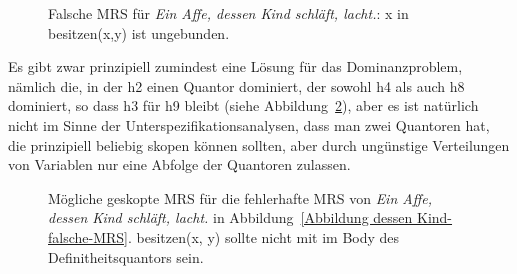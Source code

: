 \begin{figure}

\caption{Falsche MRS für \emph{Ein Affe, dessen Kind schläft, lacht.}: x in besitzen(x,y) ist ungebunden.}\label{Abbildung dessen Kind-falsch-x-ungebunden}
\end{figure}

Es gibt zwar prinzipiell zumindest eine Lösung für das Dominanzproblem, nämlich die, in der h2 einen
Quantor dominiert, der sowohl h4 als auch h8 dominiert, so dass h3 für h9 bleibt (siehe
Abbildung~\ref{Abbildung dessen Kind-falsch-geskopt}), aber es ist natürlich nicht im Sinne der
Unterspezifikationsanalysen, dass man zwei Quantoren hat, die prinzipiell beliebig skopen können
sollten, aber durch ungünstige Verteilungen von Variablen nur eine Abfolge der Quantoren zulassen.

\begin{figure}

\caption{Mögliche geskopte MRS für die fehlerhafte MRS von \emph{Ein Affe, dessen Kind schläft,
    lacht.} in Abbildung~\ref{Abbildung dessen Kind-falsche-MRS}. besitzen(x, y) sollte nicht mit im
Body des Definitheitsquantors sein.}\label{Abbildung dessen Kind-falsch-geskopt}
\end{figure}


